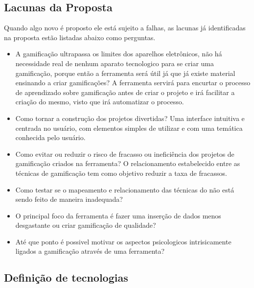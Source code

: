 \subsection{Lacunas da Proposta}

Quando algo novo é proposto ele está sujeito a falhas, as lacunas já identificadas na proposta estão listadas abaixo como perguntas.

\begin{itemize}
\item  A gamificação ultrapassa os limites dos aparelhos eletrônicos, não há necessidade real de nenhum aparato tecnologico para se criar uma gamificação, porque então a ferramenta será útil já que já existe material ensinando a criar gamificações?
	A ferramenta servirá para encurtar o processo de aprendizado sobre gamificação antes de criar o projeto e irá facilitar a criação do mesmo, visto que irá automatizar o processo.
\item  Como tornar a construção dos projetos divertidas?
	Uma interface intuitiva e centrada no usuário, com elementos simples de utilizar e com uma temática conhecida pelo usuário.
\item Como evitar ou reduzir o risco de fracasso ou ineficiência dos projetos de gamificação criados na ferramenta?
	O relacionamento estabelecido entre as técnicas de gamificação tem como objetivo reduzir a taxa de fracassos.
\item Como testar se o mapeamento e relacionamento das técnicas do não está sendo feito de maneira inadequada?
\item O principal foco da ferramenta é fazer uma inserção de dados menos desgastante ou criar gamificação de qualidade?
\item Até que ponto é possivel motivar os aspectos psicologicos intrisicamente ligados a gamificação através de uma ferramenta?

\end{itemize}

\subsection{Definição de tecnologias}

